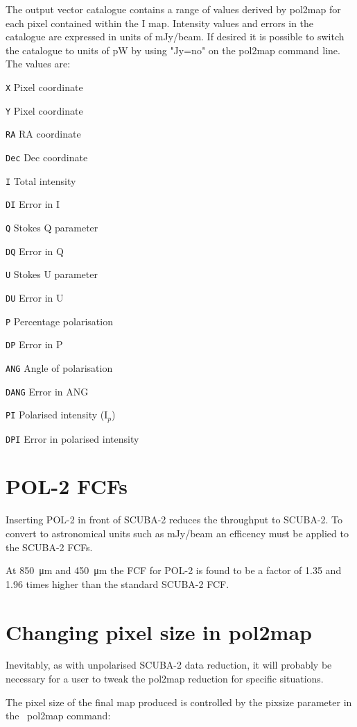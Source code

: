 The output vector catalogue contains a range of values derived by
pol2map for each pixel contained within the I map. Intensity values and
errors in the
catalogue are expressed in units of mJy/beam.  If desired it is possible
to switch the catalogue to units of pW by using "Jy=no" on the pol2map
command line.  The values are:

\begin{aligndesc}
\item[\texttt{X}] Pixel coordinate
\item[\texttt{Y}] Pixel coordinate
\item[\texttt{RA}] RA coordinate
\item[\texttt{Dec}] Dec coordinate
\item[\texttt{I}] Total intensity
\item[\texttt{DI}] Error in I
\item[\texttt{Q}] Stokes Q parameter
\item[\texttt{DQ}] Error in Q
\item[\texttt{U}] Stokes U parameter
\item[\texttt{DU}] Error in U
\item[\texttt{P}] Percentage polarisation
\item[\texttt{DP}] Error in P
\item[\texttt{ANG}] Angle of polarisation
\item[\texttt{DANG}] Error in ANG
\item[\texttt{PI}] Polarised intensity (I$_{p}$)
\item[\texttt{DPI}] Error in polarised intensity
\end{aligndesc}


\section{POL-2 FCFs}
\label{sec:pol2map-fcf}

Inserting POL-2 in front of SCUBA-2 reduces the throughput to SCUBA-2.
To convert to astronomical units such as mJy/beam an efficency must be
applied to the SCUBA-2 FCFs.

At \SI{850}{\micro\metre} and \SI{450}{\micro\metre} the FCF for POL-2
is found to be a factor of 1.35 and 1.96 times higher than the
standard SCUBA-2 FCF.


\section{Changing pixel size in pol2map}
\label{sec:pol2map-pixelsize}

Inevitably, as with unpolarised SCUBA-2 data reduction, it will
probably be necessary for a user to tweak the pol2map reduction for
specific situations.

The pixel size of the final map produced is controlled by the pixsize
parameter in the \smurf\ pol2map command:

\begin{terminalv}
\end{terminalv}









